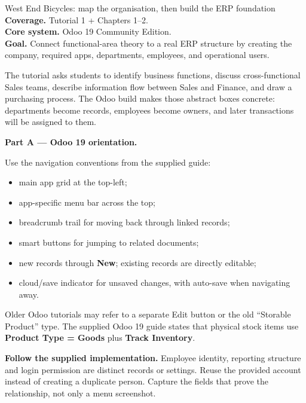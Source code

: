 
\begin{labproject}{West End Bicycles: map the organisation, then build the ERP foundation}
\textbf{Coverage.} Tutorial 1 + Chapters 1--2.\\
\textbf{Core system.} Odoo 19 Community Edition.\\
\textbf{Goal.} Connect functional-area theory to a real ERP structure by creating the company, required apps, departments, employees, and operational users.




\begin{labmode}
The tutorial asks students to identify business functions, discuss cross-functional Sales teams, describe information flow between Sales and Finance, and draw a purchasing process. The Odoo build makes those abstract boxes concrete: departments become records, employees become owners, and later transactions will be assigned to them.
\end{labmode}

\medskip\noindent\textbf{Part A --- Odoo 19 orientation.}

Use the navigation conventions from the supplied guide:
\begin{itemize}
  \item main app grid at the top-left;
  \item app-specific menu bar across the top;
  \item breadcrumb trail for moving back through linked records;
  \item smart buttons for jumping to related documents;
  \item new records through \textbf{New}; existing records are directly editable;
  \item cloud/save indicator for unsaved changes, with auto-save when navigating away.
\end{itemize}

\begin{pitfall}
Older Odoo tutorials may refer to a separate Edit button or the old ``Storable Product'' type. The supplied Odoo 19 guide states that physical stock items use \textbf{Product Type = Goods} plus \textbf{Track Inventory}.
\end{pitfall}




\textbf{Follow the supplied implementation.} Employee identity, reporting structure and login permission are distinct records or settings. Reuse the provided account instead of creating a duplicate person. Capture the fields that prove the relationship, not only a menu screenshot.



\end{labproject}
